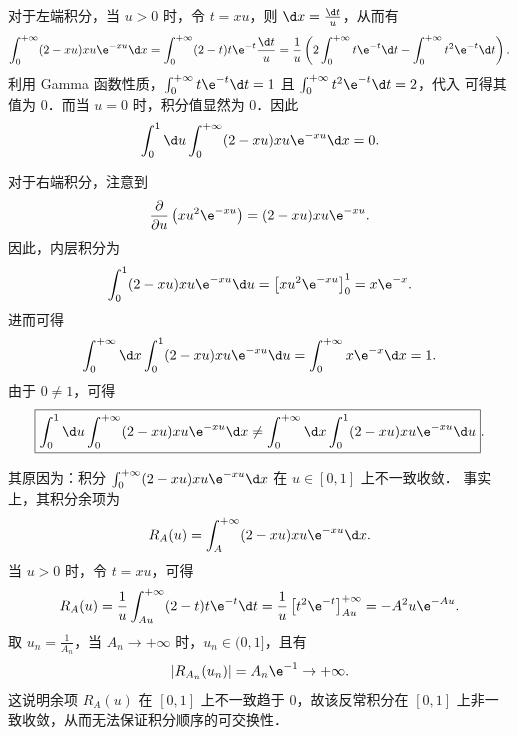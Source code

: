 \begin{solution}
    对于左端积分，当 $u > 0$ 时，令 $t = xu$，则 $\d x = \frac{\d t}{u}$，从而有
    \begin{equation}\label{eq:inner-left}
        \int_0^{+\infty} (2-xu)xu\e^{-xu} \d x = \int_0^{+\infty} (2-t)t\e^{-t} \frac{\d t}{u} = \frac{1}{u} \left( 2\int_0^{+\infty} t\e^{-t}\d t - \int_0^{+\infty} t^2\e^{-t}\d t \right).
    \end{equation}
    利用 Gamma 函数性质，$\int_0^{+\infty} t\e^{-t}\d t = 1$ 且 $\int_0^{+\infty} t^2\e^{-t}\d t = 2$，代入  可得其值为 $0$．而当 $u=0$ 时，积分值显然为 $0$．因此
    \begin{equation}\label{eq:left-val}
        \int_0^1 \d u \int_0^{+\infty} (2-xu)xu\e^{-xu} \d x = 0.
    \end{equation}

    对于右端积分，注意到
    \begin{equation}\label{eq:derivative-relation}
        \frac{\partial}{\partial u} \left( xu^2\e^{-xu} \right) = (2-xu)xu\e^{-xu}.
    \end{equation}
    因此，内层积分为
    \begin{equation}\label{eq:inner-right}
        \int_0^1 (2-xu)xu\e^{-xu} \d u = \left[ xu^2\e^{-xu} \right]_0^1 = x\e^{-x}.
    \end{equation}
    进而可得
    \begin{equation}\label{eq:right-val}
        \int_0^{+\infty} \d x \int_0^1 (2-xu)xu\e^{-xu} \d u = \int_0^{+\infty} x\e^{-x} \d x = 1.
    \end{equation}
    由于 $0 \neq 1$，可得
    \begin{equation}
        \boxed{\int_0^1 \d u \int_0^{+\infty} (2-xu)xu\e^{-xu} \d x \neq \int_0^{+\infty} \d x \int_0^1 (2-xu)xu\e^{-xu} \d u}.
    \end{equation}

    其原因为：积分 $\int_0^{+\infty} (2-xu)xu\e^{-xu} \d x$ 在 $u \in [0, 1]$ 上不一致收敛．
    事实上，其积分余项为
    \begin{equation}\label{eq:remainder}
        R_A(u) = \int_A^{+\infty} (2-xu)xu\e^{-xu} \d x.
    \end{equation}
    当 $u > 0$ 时，令 $t = xu$，可得
    \begin{equation}\label{eq:remainder-calc}
        R_A(u) = \frac{1}{u} \int_{Au}^{+\infty} (2-t)t\e^{-t} \d t = \frac{1}{u} \left[ t^2\e^{-t} \right]_{Au}^{+\infty} = -A^2 u \e^{-Au}.
    \end{equation}
    取 $u_n = \frac{1}{A_n}$，当 $A_n \to +\infty$ 时，$u_n \in (0, 1]$，且有
    \begin{equation}\label{eq:remainder-limit}
        \left| R_{A_n}(u_n) \right| = A_n \e^{-1} \to +\infty.
    \end{equation}
    这说明余项 $R_A(u)$ 在 $[0, 1]$ 上不一致趋于 $0$，故该反常积分在 $[0, 1]$ 上非一致收敛，从而无法保证积分顺序的可交换性．
\end{solution}

